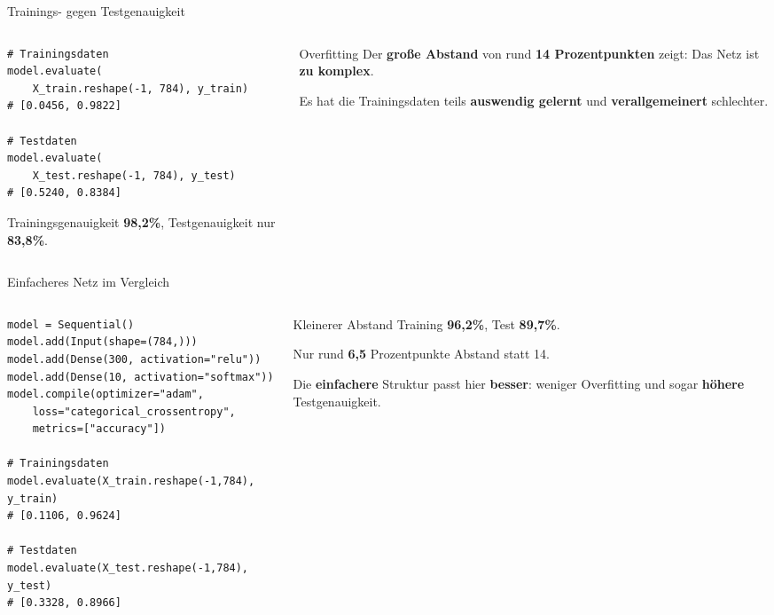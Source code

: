 \begin{frame}[fragile]{Trainings- gegen Testgenauigkeit}
\begin{columns}
\begin{column}{0.55\textwidth}
\begin{verbatim}
# Trainingsdaten
model.evaluate(
    X_train.reshape(-1, 784), y_train)
# [0.0456, 0.9822]

# Testdaten
model.evaluate(
    X_test.reshape(-1, 784), y_test)
# [0.5240, 0.8384]
\end{verbatim}

\vspace{0.3em}
Trainingsgenauigkeit \textbf{98{,}2\%}, Testgenauigkeit nur \textbf{83{,}8\%}.
\end{column}
\begin{column}{0.40\textwidth}
\begin{alertblock}{Overfitting}
Der \textbf{große Abstand} von rund \textbf{14 Prozentpunkten} zeigt: Das Netz ist \textbf{zu komplex}.
\end{alertblock}
Es hat die Trainingsdaten teils \textbf{auswendig gelernt} und \textbf{verallgemeinert} schlechter.
\end{column}
\end{columns}
\end{frame}

\begin{frame}[fragile]{Einfacheres Netz im Vergleich}
\begin{columns}
\begin{column}{0.55\textwidth}
\begin{verbatim}
model = Sequential()
model.add(Input(shape=(784,)))
model.add(Dense(300, activation="relu"))
model.add(Dense(10, activation="softmax"))
model.compile(optimizer="adam",
    loss="categorical_crossentropy",
    metrics=["accuracy"])

# Trainingsdaten
model.evaluate(X_train.reshape(-1,784), y_train)
# [0.1106, 0.9624]

# Testdaten
model.evaluate(X_test.reshape(-1,784), y_test)
# [0.3328, 0.8966]
\end{verbatim}
\end{column}
\begin{column}{0.40\textwidth}
\begin{block}{Kleinerer Abstand}
Training \textbf{96{,}2\%}, Test \textbf{89{,}7\%}.

\vspace{0.3em}
Nur rund \textbf{6{,}5} Prozentpunkte Abstand statt 14.
\end{block}
Die \textbf{einfachere} Struktur passt hier \textbf{besser}: weniger Overfitting und sogar \textbf{höhere} Testgenauigkeit.
\end{column}
\end{columns}
\end{frame}

